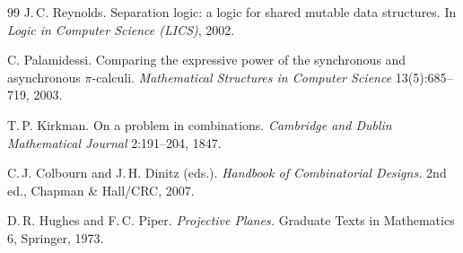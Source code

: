 \documentclass[11pt]{article}
\theoremstyle{plain}
\theoremstyle{definition}
\begin{document}
\begin{thebibliography}{99}
 J.\,C. Reynolds. Separation logic: a logic for shared mutable data structures.
In \emph{Logic in Computer Science (LICS)}, 2002.

 C. Palamidessi. Comparing the expressive power of the synchronous and
asynchronous $\pi$-calculi. \emph{Mathematical Structures in Computer Science} 13(5):685--719, 2003.

 T.\,P. Kirkman. On a problem in combinations. \emph{Cambridge and Dublin
Mathematical Journal} 2:191--204, 1847.

 C.\,J. Colbourn and J.\,H. Dinitz (eds.). \emph{Handbook of Combinatorial Designs.}
2nd ed., Chapman \& Hall/CRC, 2007.

 D.\,R. Hughes and F.\,C. Piper. \emph{Projective Planes.} Graduate Texts in
Mathematics 6, Springer, 1973.

\end{thebibliography}
\end{document}
